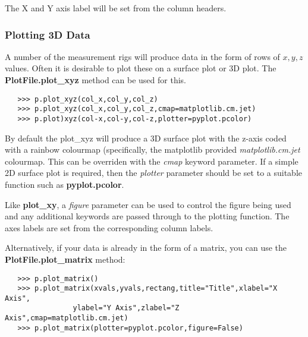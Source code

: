 \documentclass[a4paper,11pt]{scrartcl}
\begin{document}
The X and Y axis label will be set from the column headers.

\subsubsection{Plotting 3D Data}

 A number of the measurement rigs will produce data in the form of rows of $x,y,z$ values. Often it is desirable to plot these on a surface plot or 3D plot. The \textbf{PlotFile.plot\_xyz} method can be used for this.

 \begin{verbatim}
   >>> p.plot_xyz(col_x,col_y,col_z)
   >>> p.plot_xyz(col_x,col_y,col_z,cmap=matplotlib.cm.jet)
   >>> p.plot)xyz(col-x,col-y,col-z,plotter=pyplot.pcolor)
 \end{verbatim}

 By default the plot\_xyz will produce a 3D surface plot with the z-axis coded with a rainbow colourmap (specifically, the matplotlib provided \textit{matplotlib.cm.jet} colourmap. This can be overriden with the \textit{cmap} keyword parameter. If a simple 2D surface plot is required, then the \textit{plotter} parameter should be set to a suitable function such as \textbf{pyplot.pcolor}.

 Like \textbf{plot\_xy}, a \textit{figure} parameter can be used to control the figure being used and any additional keywords are passed through to the plotting function. The axes labels are set from the corresponding column labels.

 Alternatively, if your data is already in the form of a matrix, you can use the \textbf{PlotFile.plot\_matrix} method:

 \begin{verbatim}
   >>> p.plot_matrix()
   >>> p.plot_matrix(xvals,yvals,rectang,title="Title",xlabel="X Axis",
                ylabel="Y Axis",zlabel="Z Axis",cmap=matplotlib.cm.jet)
   >>> p.plot_matrix(plotter=pyplot.pcolor,figure=False)
 \end{verbatim}
\end{document}
